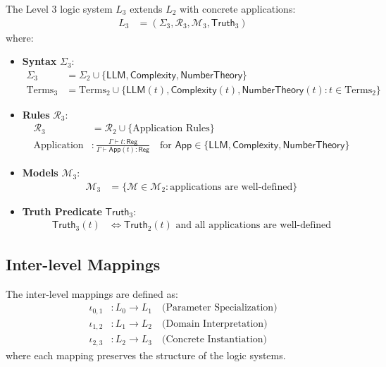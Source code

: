 \begin{definition}
The Level 3 logic system $L_3$ extends $L_2$ with concrete applications:
\begin{align}
L_3 &= (\Sigma_3, \mathcal{R}_3, \mathcal{M}_3, \mathsf{Truth}_3)
\end{align}
where:
\begin{itemize}
\item \textbf{Syntax} $\Sigma_3$:
  \begin{align}
  \Sigma_3 &= \Sigma_2 \cup \{\mathsf{LLM}, \mathsf{Complexity}, \mathsf{NumberTheory}\}\\
  \text{Terms}_3 &= \text{Terms}_2 \cup \{\mathsf{LLM}(t), \mathsf{Complexity}(t), \mathsf{NumberTheory}(t) : t \in \text{Terms}_2\}
  \end{align}
\item \textbf{Rules} $\mathcal{R}_3$:
  \begin{align}
  \mathcal{R}_3 &= \mathcal{R}_2 \cup \{\text{Application Rules}\}\\
  \text{Application} &: \frac{\Gamma \vdash t : \mathsf{Reg}}{\Gamma \vdash \mathsf{App}(t) : \mathsf{Reg}} \quad \text{for } \mathsf{App} \in \{\mathsf{LLM}, \mathsf{Complexity}, \mathsf{NumberTheory}\}
  \end{align}
\item \textbf{Models} $\mathcal{M}_3$:
  \begin{align}
  \mathcal{M}_3 &= \{\mathcal{M} \in \mathcal{M}_2 : \text{applications are well-defined}\}
  \end{align}
\item \textbf{Truth Predicate} $\mathsf{Truth}_3$:
  \begin{align}
  \mathsf{Truth}_3(t) &\Leftrightarrow \mathsf{Truth}_2(t) \text{ and all applications are well-defined}
  \end{align}
\end{itemize}
\end{definition}

\subsection{Inter-level Mappings}

\begin{definition}
The inter-level mappings are defined as:
\begin{align}
\iota_{0,1} &: L_0 \to L_1 \quad \text{(Parameter Specialization)}\\
\iota_{1,2} &: L_1 \to L_2 \quad \text{(Domain Interpretation)}\\
\iota_{2,3} &: L_2 \to L_3 \quad \text{(Concrete Instantiation)}
\end{align}
where each mapping preserves the structure of the logic systems.
\end{definition}

